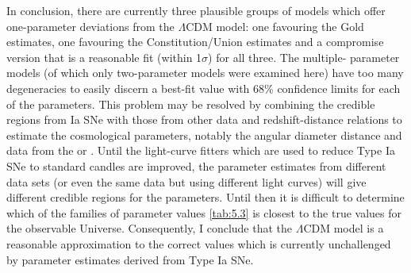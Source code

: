 In conclusion, there are currently three plausible groups of models which offer one-parameter deviations from the $\Lambda$CDM model: one favouring the Gold estimates, one favouring the Constitution/Union estimates and a compromise version that is a reasonable fit (within 1$\sigma$) for all three. The multiple- parameter models (of which only two-parameter models were examined here) have too many degeneracies to easily discern a best-fit value with 68\% confidence limits for each of the parameters. This problem may be resolved by combining the credible regions from Ia SNe with those from other data and redshift-distance relations to estimate the cosmological parameters, notably the angular diameter distance and data from the \cmb{} or \bao{}. Until the light-curve fitters which are used to reduce Type Ia SNe to standard candles are improved, the parameter estimates from different data sets (or even the same data but using different light curves) will give different credible regions for the parameters. Until then it is difficult to determine which of the families of parameter values \cref{tab:5.3} is closest to the true values for the observable Universe. Consequently, I conclude that the $\Lambda$CDM model is a reasonable approximation to the correct values which is currently unchallenged by parameter estimates derived from Type Ia SNe.